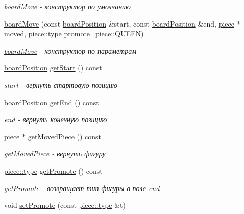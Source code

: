 \begin{DoxyCompactItemize}
\begin{DoxyCompactList}\small\item\em \hyperlink{classboard_move}{board\+Move} -\/ конструктор по умолчанию \end{DoxyCompactList}\item 
\hyperlink{classboard_move_a9cd15affd99174cc2a3c16732685ebb4}{board\+Move} (const \hyperlink{classboard_position}{board\+Position} \&start, const \hyperlink{classboard_position}{board\+Position} \&end, \hyperlink{classpiece}{piece} $\ast$moved, \hyperlink{classpiece_a60bdcec91f595c164fe08c6705f192d0}{piece\+::type} promote=piece\+::\+Q\+U\+E\+E\+N)
\begin{DoxyCompactList}\small\item\em \hyperlink{classboard_move}{board\+Move} -\/ конструктор по параметрам \end{DoxyCompactList}\item 
\hyperlink{classboard_position}{board\+Position} \hyperlink{classboard_move_a5ff01edf33101210e4696df6da9deb96}{get\+Start} () const 
\begin{DoxyCompactList}\small\item\em start -\/ вернуть стартовую позицию \end{DoxyCompactList}\item 
\hyperlink{classboard_position}{board\+Position} \hyperlink{classboard_move_a4a4b131bae70142a31a43cfa3761c19d}{get\+End} () const 
\begin{DoxyCompactList}\small\item\em end -\/ вернуть конечную позицию \end{DoxyCompactList}\item 
\hyperlink{classpiece}{piece} $\ast$ \hyperlink{classboard_move_a5d08192556a8167d800d43b5a69f6b6f}{get\+Moved\+Piece} () const 
\begin{DoxyCompactList}\small\item\em get\+Moved\+Piece -\/ вернуть фигуру \end{DoxyCompactList}\item 
\hyperlink{classpiece_a60bdcec91f595c164fe08c6705f192d0}{piece\+::type} \hyperlink{classboard_move_aaf7f4911fddc16bbd4555eafdd6321b2}{get\+Promote} () const 
\begin{DoxyCompactList}\small\item\em get\+Promote -\/ возвращает тип фигуры в поле end \end{DoxyCompactList}\item 
void \hyperlink{classboard_move_a8ce468f874b246675cb5b1449e7385af}{set\+Promote} (const \hyperlink{classpiece_a60bdcec91f595c164fe08c6705f192d0}{piece\+::type} \&t)

\end{DoxyCompactItemize}
